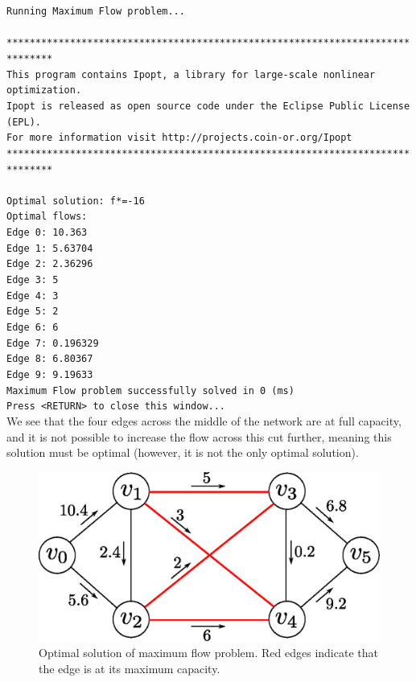 \newline
{\footnotesize{\texttt{Running Maximum Flow problem...\\
\\
******************************************************************************\\
This program contains Ipopt, a library for large-scale nonlinear optimization.\\
 Ipopt is released as open source code under the Eclipse Public License (EPL).\\
         For more information visit http://projects.coin-or.org/Ipopt\\
******************************************************************************\\
\\
Optimal solution: f*=-16\\
Optimal flows:\\
Edge 0: 10.363\\
Edge 1: 5.63704\\
Edge 2: 2.36296\\
Edge 3: 5\\
Edge 4: 3\\
Edge 5: 2\\
Edge 6: 6\\
Edge 7: 0.196329\\
Edge 8: 6.80367\\
Edge 9: 9.19633\\
Maximum Flow problem successfully solved in 0 (ms)\\
Press <RETURN> to close this window...\\
}}}
We see that the four edges across the middle of the network are at full capacity, and it is not possible to increase the flow across this cut further, meaning this solution must be optimal (however, it is not the only optimal solution).

\begin{figure}[H]
\centering
\includegraphics[scale=0.6]{figures/flownetwork_sol1.eps}
\caption{Optimal solution of maximum flow problem. Red edges indicate that the edge is at its maximum capacity.}
\label{fig:flownetwork_sol1}
\end{figure}

